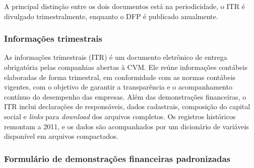 


A principal distinção entre os dois documentos está na periodicidade, o ITR é divulgado trimestralmente, enquanto o DFP é publicado anualmente.

\subsubsection{Informações trimestrais}

As informações trimestrais (ITR) é um documento eletrônico de entrega obrigatória pelas companhias abertas à CVM. Ele reúne informações contábeis elaboradas de forma trimestral, em conformidade com as normas contábeis vigentes, com o objetivo de garantir a transparência e o acompanhamento contínuo do desempenho das empresas. Além das demonstrações financeiras, o ITR inclui declarações de responsáveis, dados cadastrais, composição do capital social e \textit{links} para \textit{download} dos arquivos completos. Os registros históricos remontam a 2011, e os dados são acompanhados por um dicionário de variáveis disponível em arquivos compactados.

\subsubsection{Formulário de demonstrações financeiras padronizadas}

